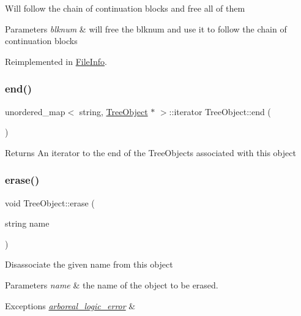 Will follow the chain of continuation blocks and free all of them 
\begin{DoxyParams}{Parameters}
{\em blknum} & will free the blknum and use it to follow the chain of continuation blocks \\
\hline
\end{DoxyParams}


Reimplemented in \mbox{\hyperlink{classFileInfo_a530a418e213a0a945b75ee1dcb8f6acb}{File\+Info}}.

\mbox{\label{classTreeObject_a2544e2976f3b75cd1f0230f5f908059c}} 
\subsubsection{\texorpdfstring{end()}{end()}}
{\footnotesize\ttfamily unordered\+\_\+map$<$ string, \mbox{\hyperlink{classTreeObject}{Tree\+Object}} $\ast$ $>$\+::iterator Tree\+Object\+::end (\begin{DoxyParamCaption}{ }\end{DoxyParamCaption})}

\begin{DoxyReturn}{Returns}
An iterator to the end of the Tree\+Objects associated with this object 
\end{DoxyReturn}
\mbox{\label{classTreeObject_a453b5df2a9ef7c6faad259900d574ee2}} 
\subsubsection{\texorpdfstring{erase()}{erase()}}
{\footnotesize\ttfamily void Tree\+Object\+::erase (\begin{DoxyParamCaption}\item[{string}]{name }\end{DoxyParamCaption})\hspace{0.3cm}{\ttfamily [virtual]}}

Disassociate the given name from this object 
\begin{DoxyParams}{Parameters}
{\em name} & the name of the object to be erased. \\
\hline
\end{DoxyParams}

\begin{DoxyExceptions}{Exceptions}
{\em \mbox{\hyperlink{classarboreal__logic__error}{arboreal\+\_\+logic\+\_\+error}}} & \\
\hline
\end{DoxyExceptions}


